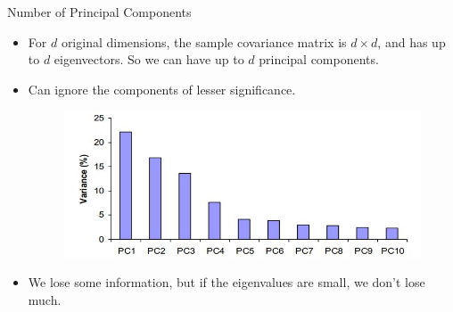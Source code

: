 \documentclass[serif, aspectratio=169]{beamer}
\begin{document}
\begin{frame}{Number of Principal Components}
    \begin{itemize}
        \item For $d$ original dimensions, the sample covariance matrix is $d \times d$, and has up to $d$ eigenvectors. So we can have up to $d$ principal components.
        \item Can ignore the components of lesser significance.
        \begin{figure}[htpb]
            \begin{center}
                \includegraphics[keepaspectratio, scale=0.6]{pic/var.JPG}
            \end{center}
        \end{figure}
        \item We lose some information, but if the eigenvalues are small, we don’t lose much.
    \end{itemize}
\end{frame}
\end{document}
